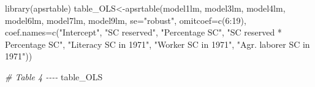 \documentclass[
]{article}
\newenvironment{Shaded}{\begin{snugshade}}{\end{snugshade}}
\newcommand{\AttributeTok}[1]{\textcolor[rgb]{0.77,0.63,0.00}{#1}}
\newcommand{\CommentTok}[1]{\textcolor[rgb]{0.56,0.35,0.01}{\textit{#1}}}
\newcommand{\DecValTok}[1]{\textcolor[rgb]{0.00,0.00,0.81}{#1}}
\newcommand{\FunctionTok}[1]{\textcolor[rgb]{0.00,0.00,0.00}{#1}}
\newcommand{\NormalTok}[1]{#1}
\newcommand{\OtherTok}[1]{\textcolor[rgb]{0.56,0.35,0.01}{#1}}
\newcommand{\SpecialCharTok}[1]{\textcolor[rgb]{0.00,0.00,0.00}{#1}}
\newcommand{\StringTok}[1]{\textcolor[rgb]{0.31,0.60,0.02}{#1}}
\begin{document}
\begin{Shaded}
\begin{Highlighting}[]
\FunctionTok{library}\NormalTok{(apsrtable)}
\NormalTok{table\_OLS}\OtherTok{\textless{}{-}}\FunctionTok{apsrtable}\NormalTok{(model1lm, model3lm, model4lm, model6lm, model7lm, model9lm, }\AttributeTok{se=}\StringTok{"robust"}\NormalTok{, }\AttributeTok{omitcoef=}\FunctionTok{c}\NormalTok{(}\DecValTok{6}\SpecialCharTok{:}\DecValTok{19}\NormalTok{),  }\AttributeTok{coef.names=}\FunctionTok{c}\NormalTok{(}\StringTok{"Intercept"}\NormalTok{, }\StringTok{"SC reserved"}\NormalTok{, }\StringTok{"Percentage SC"}\NormalTok{, }\StringTok{"SC reserved * Percentage SC"}\NormalTok{, }\StringTok{"Literacy SC in 1971"}\NormalTok{, }\StringTok{"Worker SC in 1971"}\NormalTok{, }\StringTok{"Agr. laborer SC in 1971"}\NormalTok{))}

\CommentTok{\# Table 4 {-}{-}{-}{-}}
\NormalTok{table\_OLS}
\end{Highlighting}
\end{Shaded}
\end{document}
